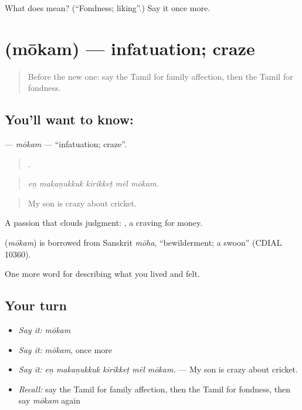 \begin{tcolorbox}[breakable,colback=teal!4,colframe=teal!35!black,title={Before you move on}]
What does  mean? (\textquotedblleft{}Fondness; liking\textquotedblright{}.) Say it once more.
\end{tcolorbox}
\section[\texorpdfstring{\ta{மோகம்} (mōkam)}{மோகம் (mōkam)}]{ (mōkam) — infatuation; craze}

\label{lesson:TA-C465-mokam}



\begin{quote}
Before the new one: say the Tamil for family affection, then the Tamil for fondness.
\end{quote}

\subsection*{You'll want to know: }
\textbf{} — \emph{mōkam} — \textquotedblleft{}infatuation; craze\textquotedblright{}.

\begin{quote}
    .
\end{quote}

\begin{quote}
\emph{eṉ makaṉukkuk kirikkeṭ mēl mōkam.}
\end{quote}

\begin{quote}
My son is crazy about cricket.
\end{quote}

A passion that clouds judgment:  , a craving for money.

\begin{cousinweb}
\textbf{} (\emph{mōkam}) is borrowed from Sanskrit \emph{mōha}, \textquotedblleft{}bewilderment; a swoon\textquotedblright{} (CDIAL 10360).
\end{cousinweb}

\begin{grammarlens}[title={What you've built}]
One more word for describing what you lived and felt.
\end{grammarlens}

\subsection*{Your turn}
\begin{itemize}
\raggedright
  \item \emph{Say it:} \emph{mōkam}
  \item \emph{Say it:} \emph{mōkam}, once more
  \item \emph{Say it:} \emph{eṉ makaṉukkuk kirikkeṭ mēl mōkam.} — My son is crazy about cricket.
  \item \emph{Recall:} say the Tamil for family affection, then the Tamil for fondness, then say \emph{mōkam} again
\end{itemize}

